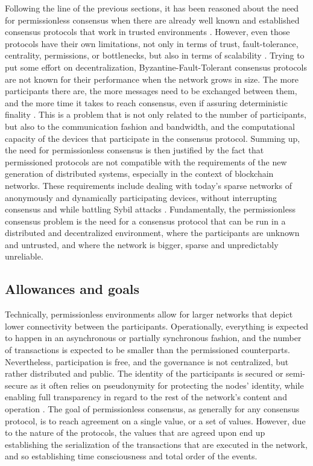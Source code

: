 \documentclass[journal]{IEEEtran}
\begin{document}
Following the line of the previous sections, it has been reasoned about the need 
for permissionless consensus when there are already well known and established consensus protocols
that work in trusted environments \cite{castro1999practical, miller2016honey}. However, even those protocols have
their own limitations, not only in terms of trust, fault-tolerance, centrality, permissions,
or bottlenecks, but also in terms of scalability \cite{miller2016honey}. Trying to put some effort on decentralization, 
Byzantine-Fault-Tolerant consensus protocols are not known for their performance when the network grows
in size. The more participants there are, the more messages need to be exchanged
between them, and the more time it takes to reach consensus, even if assuring deterministic finality \cite{decker2016bitcoin}. 
This is a problem that is not only related to the number of participants, but also to the
communication fashion and bandwidth, and the computational capacity of the devices that
participate in the consensus protocol. 
Summing up, the need for permissionless consensus is then justified by the fact that
permissioned protocols are not compatible with the requirements of the new generation of
distributed systems, especially in the context of blockchain networks. 
These requirements include dealing with today's sparse networks of anonymously and dynamically
participating devices, without interrupting consensus and while battling Sybil attacks \cite{survey-dist-consensus}.
Fundamentally, the permissionless consensus problem is the need for a consensus protocol that
can be run in a distributed and decentralized environment, where the participants are unknown and untrusted,
and where the network is bigger, sparse and unpredictably unreliable.

\subsection{Allowances and goals}

Technically, permissionless environments allow for larger networks
that depict lower connectivity between the participants. Operationally,
everything is expected to happen in an asynchronous or partially synchronous fashion, 
and the number of transactions is expected to be smaller than the 
permissioned counterparts. Nevertheless, participation is free, and the
governance is not centralized, but rather distributed and public. 
The identity of the participants is secured or semi-secure as it often relies on
pseudonymity for protecting the nodes' identity, while enabling full transparency 
in regard to the rest of the network's content and operation \cite{xiao2019distributed}.
The goal of permissionless consensus, as generally for any consensus protocol, is to reach
agreement on a single value, or a set of values. However, due to the nature of the
protocols, the values that are agreed upon end up establishing the serialization of the
transactions that are executed in the network, and so establishing time consciousness and 
total order of the events.
\end{document}
